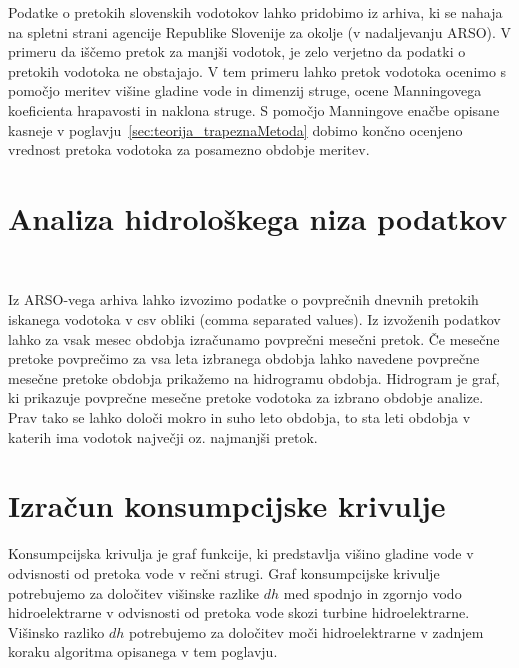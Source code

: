  
 
  Podatke o pretokih slovenskih vodotokov lahko pridobimo iz arhiva, ki se nahaja na spletni strani agencije Republike Slovenije za okolje (v nadaljevanju ARSO). V primeru da iščemo pretok za manjši vodotok, je zelo verjetno da podatki o pretokih vodotoka ne obstajajo. V tem primeru lahko pretok vodotoka ocenimo s pomočjo meritev višine gladine vode in dimenzij struge, ocene Manningovega koeficienta hrapavosti in naklona struge. S pomočjo Manningove enačbe opisane kasneje v poglavju~\ref{sec:teorija_trapeznaMetoda} dobimo končno ocenjeno vrednost pretoka vodotoka za posamezno obdobje meritev.




\section{Analiza hidrološkega niza podatkov}~\label{sec:teorija_hidrogramObdobja}


Iz ARSO-vega arhiva lahko izvozimo podatke o povprečnih dnevnih pretokih iskanega vodotoka v csv obliki (comma separated values). Iz izvoženih podatkov lahko za vsak mesec obdobja izračunamo povprečni mesečni pretok. Če mesečne pretoke povprečimo za vsa leta izbranega obdobja lahko navedene povprečne mesečne pretoke obdobja prikažemo na hidrogramu obdobja. Hidrogram je graf, ki prikazuje povprečne mesečne pretoke vodotoka za izbrano obdobje analize. Prav tako se lahko določi mokro in suho leto obdobja, to sta leti obdobja v katerih ima vodotok največji oz. najmanjši pretok.







\section{Izračun konsumpcijske krivulje}
Konsumpcijska krivulja je graf funkcije, ki predstavlja višino gladine vode v odvisnosti od pretoka vode v rečni strugi. Graf konsumpcijske krivulje potrebujemo za določitev višinske razlike $dh$ med spodnjo in zgornjo vodo hidroelektrarne v odvisnosti od pretoka vode skozi turbine hidroelektrarne. Višinsko razliko $dh$ potrebujemo za določitev moči hidroelektrarne v zadnjem koraku algoritma opisanega v tem poglavju.



